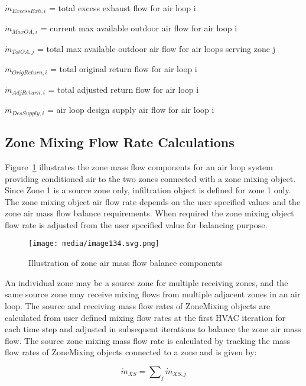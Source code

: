 \(\dot m_{ExcessExh,i}\) = total excess exhaust flow for air loop i

\(\dot m_{MaxOA,i}\) = current max available outdoor air flow for air loop i

\(\dot m_{TotOA,j}\) = total max available outdoor air flow for air loops serving zone j

\(\dot m_{OrigReturn,i}\) = total original return flow for air loop i

\(\dot m_{AdjReturn,i}\) = total adjusted return flow for air loop i

\(\dot m_{DesSupply,i}\) = air loop design supply air flow for air loop i

\subsection{Zone Mixing Flow Rate Calculations}\label{zone-mixing-flow-rate-calculations}

Figure~\ref{fig:illustration-of-zone-air-mass-flow-balance} illustrates the zone mass flow components for an air loop system providing conditioned air to the two zones connected with a zone mixing object. Since Zone 1 is a source zone only, infiltration object is defined for zone 1 only. The zone mixing object air flow rate depends on the user specified values and the zone air mass flow balance requirements. When required the zone mixing object flow rate is adjusted from the user specified value for balancing purpose.

\begin{figure}[hbtp] %
\centering
\texttt{[image: media/image134.svg.png]}
\caption{Illustration of zone air mass flow balance components \protect \label{fig:illustration-of-zone-air-mass-flow-balance}}
\end{figure}

An individual zone may be a source zone for multiple receiving zones, and the same source zone may receive mixing flows from multiple adjacent zones in an air loop. The source and receiving mass flow rates of ZoneMixing objects are calculated from user defined mixing flow rates at the first HVAC iteration for each time step and adjusted in subsequent iterations to balance the zone air mass flow. The source zone mixing mass flow rate is calculated by tracking the mass flow rates of ZoneMixing objects connected to a zone and is given by:

\begin{equation}
{\dot m_{XS}} = \sum\nolimits_j {{{\dot m}_{XS,j}}}
\end{equation}

